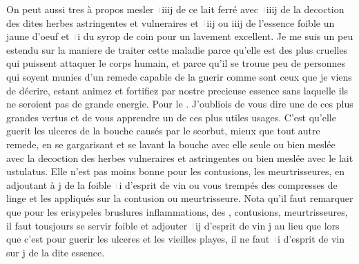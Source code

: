 \pend%
\pstart%
On peut aussi tres \`{a} propos mesler \includegraphics[width=0.014\textwidth]{images/uncia.pdf}iiij de ce lait ferr\'{e} avec \includegraphics[width=0.014\textwidth]{images/uncia.pdf}iiij de la decoction des dites herbes astringentes et vulneraires et \includegraphics[width=0.014\textwidth]{images/uncia.pdf}iij ou iiij de l'essence foible un jaune d'oeuf et \includegraphics[width=0.014\textwidth]{images/uncia.pdf}i du
syrop de coin pour un lavement excellent. 
\pend%
\pstart%
Je me suis un peu estendu sur la maniere de traiter cette maladie parce qu'elle est des plus cruelles qui puissent attaquer le corps humain, et parce qu'il se trouue peu de personnes qui soyent munies d'un remede capable de la guerir comme sont ceux que je viens de d\'{e}crire, estant animez et fortifiez par nostre precieuse essence sans laquelle ils ne seroient pas de grande energie.
\pend%
\pstart%
Pour le . J'oubliois de vous dire une de ces plus grandes vertus et de vous apprendre un de ces plus utiles usages. C'est qu'elle guerit les ulceres de la bouche caus\'{e}s par le scorbut, mieux que tout autre remede, en se gargarisant et se lavant la bouche avec elle seule ou bien mesl\'{e}e avec la decoction des herbes vulneraires et astringentes ou bien mesl\'{e}e avec le lait ustulatus. Elle n'est pas moins bonne pour les contusions, les meurtrisseures, en adjoutant \`{a} \Pfund j de la foible \includegraphics[width=0.014\textwidth]{images/uncia.pdf}i d'esprit de vin ou vous tremp\'{e}s des compresses de linge et les appliqu\'{e}s sur la contusion ou meurtrisseure.
\pend%
\pstart%
Nota qu'il faut remarquer que pour les erisypeles bruslures inflammations, des , contusions, meurtrisseures, il faut tousjours se servir  foible et adjouter \includegraphics[width=0.014\textwidth]{images/uncia.pdf}ij d'esprit de vin   \Pfund j au lieu que lors que c'est pour guerir les ulceres et les vieilles playes, il ne faut \includegraphics[width=0.014\textwidth]{images/uncia.pdf}i d'esprit de vin sur \Pfund j de la dite essence.
\pend%
\count{}
\count{}
\count{}
